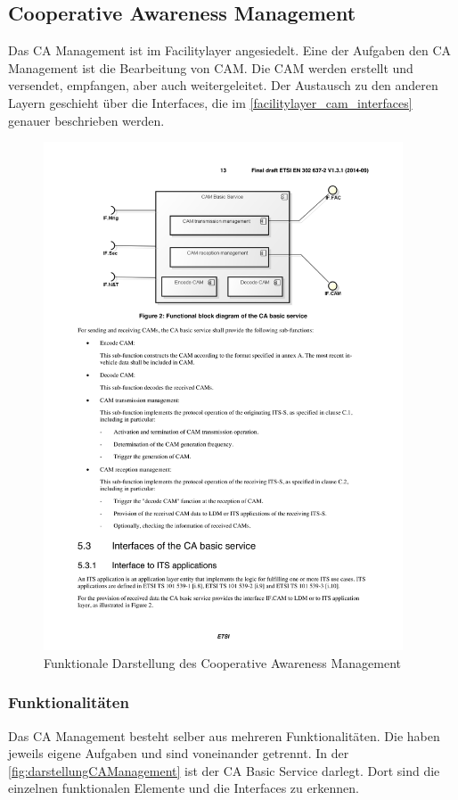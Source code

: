 \subsection{Cooperative Awareness Management}
Das \ac{CA} Management ist im Facilitylayer angesiedelt. Eine der Aufgaben den \ac{CA} Management ist die Bearbeitung von \ac{CAM}. Die \ac{CAM} werden erstellt und versendet, empfangen, aber auch weitergeleitet. Der Austausch zu den anderen Layern geschieht über die Interfaces, die im \autoref{facilitylayer_cam_interfaces} genauer beschrieben werden.  

\begin{figure}[htbp]
	\includegraphics[width=0.95\textwidth]{content/images/04_facilitylayer/caManagementLAyerUebersicht.pdf}
	\caption{Funktionale Darstellung des Cooperative Awareness Management}
	\label{fig:darstellungCAManagement}
\end{figure}

\subsubsection{Funktionalitäten}
Das \ac{CA} Management besteht selber aus mehreren Funktionalitäten. Die haben jeweils eigene Aufgaben und sind voneinander getrennt. In der \autoref{fig:darstellungCAManagement} ist der \ac{CA} Basic Service darlegt. Dort sind die einzelnen funktionalen Elemente und die Interfaces zu erkennen.

